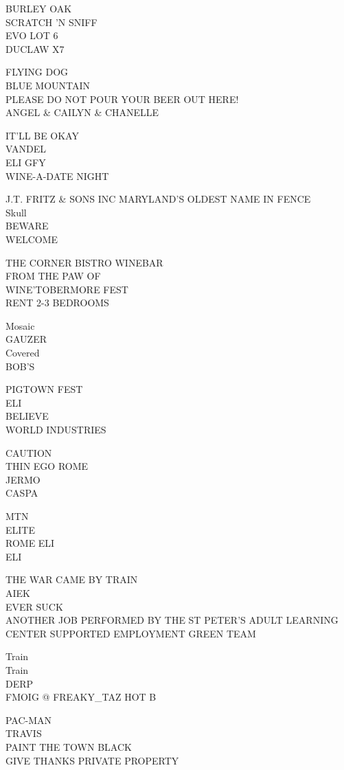 \documentclass[10pt,letterpaper]{article}
\begin{document}
BURLEY OAK\\
SCRATCH 'N SNIFF\\
EVO LOT 6\\
DUCLAW X7

FLYING DOG\\
BLUE MOUNTAIN\\
PLEASE DO NOT POUR YOUR BEER OUT HERE!\\
ANGEL \& CAILYN \& CHANELLE

IT'LL BE OKAY\\
VANDEL\\
ELI GFY\\
WINE{-}A{-}DATE NIGHT

J.T. FRITZ \& SONS INC MARYLAND'S OLDEST NAME IN FENCE\\
Skull\\
BEWARE\\
WELCOME

THE CORNER BISTRO WINEBAR\\
FROM THE PAW OF\\
WINE'TOBERMORE FEST\\
RENT 2{-}3 BEDROOMS

Mosaic\\
GAUZER\\
Covered\\
BOB'S

PIGTOWN FEST\\
ELI\\
BELIEVE\\
WORLD INDUSTRIES

CAUTION\\
THIN EGO ROME\\
JERMO\\
CASPA

MTN\\
ELITE\\
ROME ELI\\
ELI

THE WAR CAME BY TRAIN\\
AIEK\\
EVER SUCK\\
ANOTHER JOB PERFORMED BY THE ST PETER'S ADULT LEARNING CENTER SUPPORTED EMPLOYMENT GREEN TEAM

Train\\
Train\\
DERP\\
FMOIG @ FREAKY\_TAZ HOT B

PAC{-}MAN\\
TRAVIS\\
PAINT THE TOWN BLACK\\
GIVE THANKS PRIVATE PROPERTY
\end{document}

